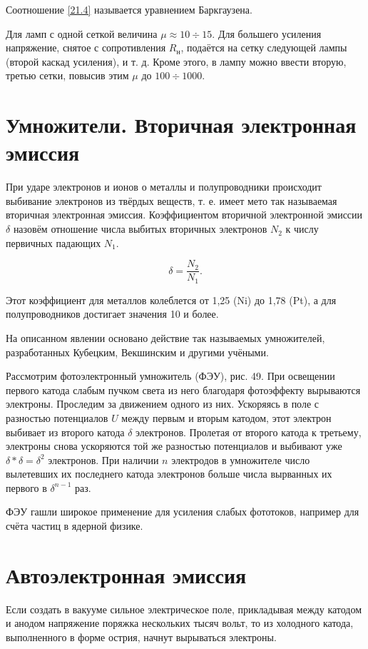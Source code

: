 \documentclass[a4paper,10pt]{book}
\begin{document}
Соотношение \ref{21.4} называется уравнением Баркгаузена.

Для ламп с одной сеткой величина $\mu \approx 10 \div 15$. Для большего усиления напряжение, снятое с сопротивления $R_\text{н}$, подаётся на сетку следующей лампы (второй каскад усиления), и т. д. Кроме этого, в лампу можно ввести вторую, третью сетки, повысив этим $\mu$ до $100 \div 1000$.

\section{Умножители. Вторичная электронная эмиссия}

При ударе электронов и ионов о металлы и полупроводники происходит выбивание электронов из твёрдых веществ, т. е. имеет мето так называемая вторичная электронная эмиссия. Коэффициентом вторичной электронной эмиссии $\delta$ назовём отношение числа выбитых вторичных электронов $N_2$ к числу первичных падающих $N_1$.

\begin{equation}
\delta = \frac{N_2}{N_1}.
\end{equation}

Этот коэффициент для металлов колеблется от 1,25 (Ni) до 1,78 (Pt), а для полупроводников достигает значения 10 и более.

На описанном явлении основано действие так называемых умножителей, разработанных Кубецким, Векшинским и другими учёными.

Рассмотрим фотоэлектронный умножитель (ФЭУ), рис. 49. При освещении первого катода слабым пучком света из него благодаря фотоэффекту вырываются электроны. Проследим за движением одного из них. Ускоряясь в поле с разностью потенциалов $U$ между первым и вторым катодом, этот электрон выбивает из второго катода $\delta$ электронов. Пролетая от второго катода к третьему, электроны снова ускоряются той же разностью потенциалов и выбивают уже $\delta*\delta=\delta^{2}$ электронов. При наличии $n$ электродов в умножителе число вылетевших их последнего катода электронов больше числа вырванных их первого в $\delta^{n-1}$ раз.

ФЭУ гашли широкое применение для усиления слабых фототоков, например для счёта частиц в ядерной физике.

\section{Автоэлектронная эмиссия}

Если создать в вакууме сильное электрическое поле, прикладывая между катодом и анодом напряжение поряжка нескольких тысяч вольт, то из холодного катода, выполненного в форме острия, начнут вырываться электроны.
\end{document}
